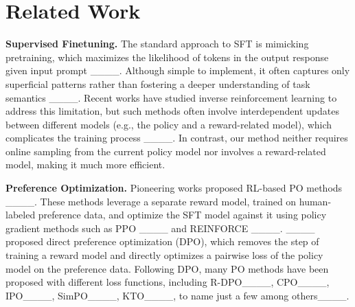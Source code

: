 \section{Related Work}
{\bf Supervised Finetuning.} The standard approach to SFT is mimicking pretraining, which maximizes the likelihood of tokens in the output response given input prompt ____. Although simple to implement, it often captures only superficial patterns rather than fostering a deeper understanding of task semantics ____. Recent works have studied inverse reinforcement learning to address this limitation, but such methods often involve interdependent updates between different models (e.g., the policy and a reward-related model), which complicates the training process ____. In contrast, our method neither requires online sampling from the current policy model nor involves a reward-related model, making it much more efficient.%

{\bf Preference Optimization.} Pioneering works proposed RL-based PO methods ____. These methods leverage a separate reward model, trained on human-labeled preference data, and optimize the SFT model against it using policy gradient methods such as PPO ____ and REINFORCE ____.
____ proposed direct preference optimization (DPO), which removes the step of training a reward model and directly optimizes a pairwise loss of the policy model on the preference data. Following DPO, many PO methods have been proposed with different loss functions, including R-DPO____, CPO____, IPO____, SimPO____, KTO____, to name just a few among others____.  

